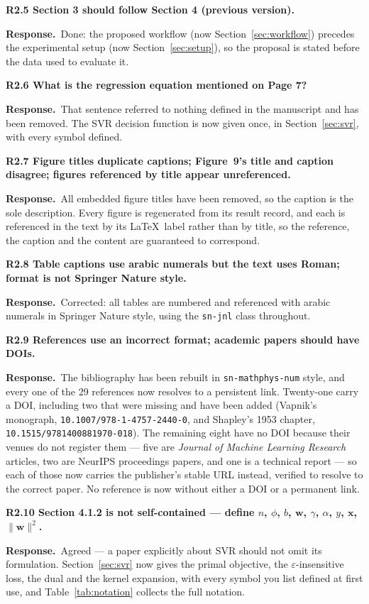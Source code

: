 \documentclass[11pt,a4paper]{article}
\newcommand{\reply}{\par\noindent\textbf{Response.}\ }
\newcommand{\pt}[1]{\par\medskip\noindent\textbf{#1}\par}
\begin{document}
\pt{R2.5 Section 3 should follow Section 4 (previous version).}
\reply Done: the proposed workflow (now Section~\ref{sec:workflow}) precedes the experimental setup (now
Section~\ref{sec:setup}), so the proposal is stated before the data used to evaluate it.

\pt{R2.6 What is the regression equation mentioned on Page 7?}
\reply That sentence referred to nothing defined in the manuscript and has been removed. The
SVR decision function is now given once, in Section~\ref{sec:svr}, with every symbol defined.

\pt{R2.7 Figure titles duplicate captions; Figure~9's title and caption disagree; figures
referenced by title appear unreferenced.}
\reply All embedded figure titles have been removed, so the caption is the sole description.
Every figure is regenerated from its result record, and each is referenced in the text by
its \LaTeX\ label rather than by title, so the reference, the caption and the content are
guaranteed to correspond.

\pt{R2.8 Table captions use arabic numerals but the text uses Roman; format is not Springer
Nature style.}
\reply Corrected: all tables are numbered and referenced with arabic numerals in Springer
Nature style, using the \texttt{sn-jnl} class throughout.

\pt{R2.9 References use an incorrect format; academic papers should have DOIs.}
\reply The bibliography has been rebuilt in \texttt{sn-mathphys-num} style, and every one
of the 29 references now resolves to a persistent link. Twenty-one carry a DOI, including two
that were missing and have been added (Vapnik's monograph,
\texttt{10.1007/978-1-4757-2440-0}, and Shapley's 1953 chapter,
\texttt{10.1515/9781400881970-018}). The remaining eight have no DOI because their venues do
not register them --- five are \emph{Journal of Machine Learning Research} articles, two are
NeurIPS proceedings papers, and one is a technical report --- so each of those now carries the
publisher's stable URL instead, verified to resolve to the correct paper. No reference is now
without either a DOI or a permanent link.

\pt{R2.10 Section 4.1.2 is not self-contained --- define $n$, $\phi$, $b$, $\mathbf{w}$,
$\gamma$, $\alpha$, $y$, $\mathbf{x}$, $\|\mathbf{w}\|^2$.}
\reply Agreed --- a paper explicitly about SVR should not omit its formulation.
Section~\ref{sec:svr} now gives the primal objective, the $\varepsilon$-insensitive loss, the dual and
the kernel expansion, with every symbol you list defined at first use, and Table~\ref{tab:notation} collects
the full notation.
\end{document}
